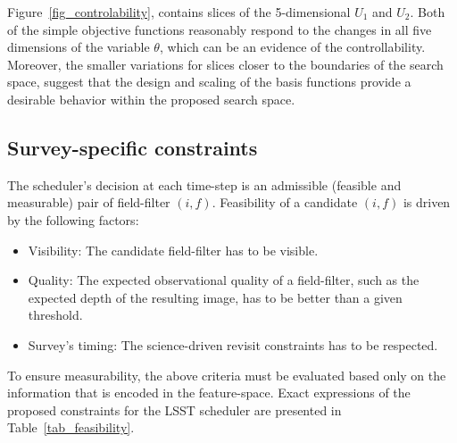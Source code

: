 \documentclass[12pt]{aastex62}
\theoremstyle{definition}
\begin{document}
Figure~\ref{fig_controlability}, contains slices of the 5-dimensional $U_1$ and $U_2$. Both of the simple objective functions reasonably respond to the changes in all five dimensions of the variable $\theta$, which can be an evidence of the controllability. Moreover, the smaller variations for slices closer to the boundaries of the search space, suggest that the design and scaling of the basis functions provide a desirable behavior within the proposed search space.

\subsection{Survey-specific constraints}\label{sec_cstr}

The scheduler's decision at each time-step is an admissible (feasible and measurable) pair of field-filter $(i,f)$. Feasibility of a candidate $(i,f)$ is driven by the following factors:

\begin{itemize}
\item Visibility: The candidate field-filter has to be visible.
\item Quality: The expected observational quality of a field-filter, such as the expected depth of the resulting image, has to be better than a given threshold.
\item Survey's timing: The science-driven revisit constraints has to be respected.
\end{itemize}

To ensure measurability, the above criteria must be evaluated based only on the information that is encoded in the feature-space. Exact expressions of the proposed constraints for the LSST scheduler are presented in Table~\ref{tab_feasibility}.
\end{document}

